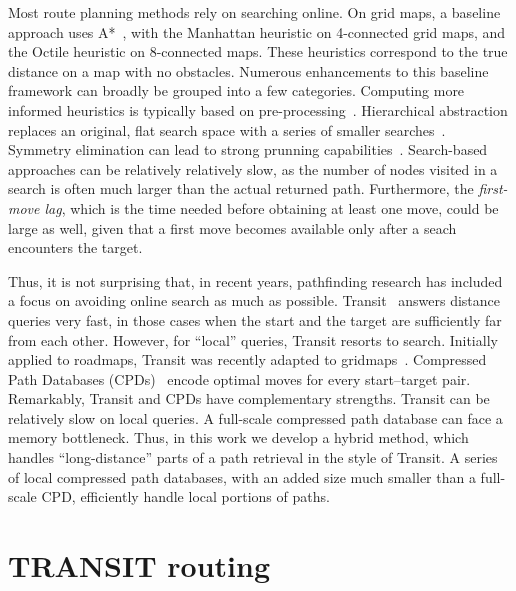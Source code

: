 \documentclass[runningheads,a4paper]{llncs}
\begin{document}
Most route planning methods rely on searching online.
On grid maps, a baseline approach uses A*~\cite{hart68}, with 
the Manhattan heuristic on 4-connected grid maps,
and the Octile heuristic on 8-connected maps.
These heuristics correspond to the true distance on a map with no obstacles.
Numerous enhancements to this baseline framework can broadly be grouped into
a few categories. Computing more informed heuristics is typically based on
pre-processing~\cite{goldberg05,bjornsson06,sturtevant09}.
Hierarchical abstraction replaces an original, flat search space with a
series of smaller searches~\cite{botea04,sturtevant05}.
Symmetry elimination can lead to strong prunning 
capabilities~\cite{harabor10,harabor11b}.
Search-based approaches can be relatively relatively slow, as the number of 
nodes visited in a search is often much larger than the actual returned path.
Furthermore, the \emph{first-move lag}, which is the time needed before
obtaining at least one move, could be large as well, given that a first move
becomes available only after a seach encounters the target.

Thus, it is not surprising that, in recent years,
pathfinding research has included a focus on avoiding online search
as much as possible.
Transit~\cite{bast06} answers distance queries very fast, in those
cases when the start and the target are sufficiently far from each
other. However, for ``local'' queries, Transit resorts to search.
Initially applied to roadmaps, Transit was recently adapted to 
gridmaps~\cite{antsfeld12}.
Compressed Path Databases (CPDs)~\cite{botea11,DBLP:conf/socs/Botea12}
encode optimal moves for every start--target pair.
Remarkably, Transit and CPDs have complementary strengths.
Transit can be relatively slow on local queries. 
A full-scale compressed path database can face a memory bottleneck.
Thus, in this work we develop a hybrid method, which handles 
``long-distance'' parts of a path retrieval in the style of Transit.
A series of local compressed path databases, with an added size much
smaller than a full-scale CPD, efficiently handle local portions
of paths.




\section{TRANSIT routing}\label{sec:transit}
\end{document}
